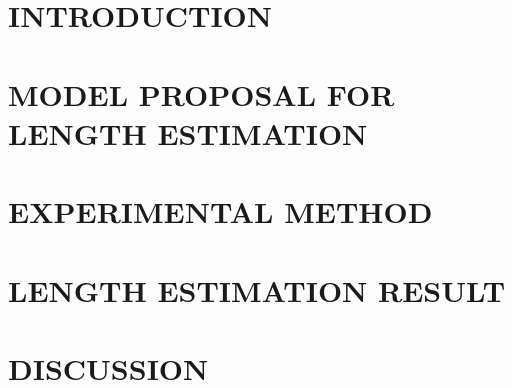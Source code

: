 \documentclass[conference,a4paper,final]{IEEEtran}
\begin{document}


\section{INTRODUCTION}


\section{MODEL PROPOSAL FOR LENGTH ESTIMATION}


\section{EXPERIMENTAL METHOD}


\section{LENGTH ESTIMATION RESULT}


\section{DISCUSSION}


% 

% 


\clearpage

\footnotesize


\end{document}
